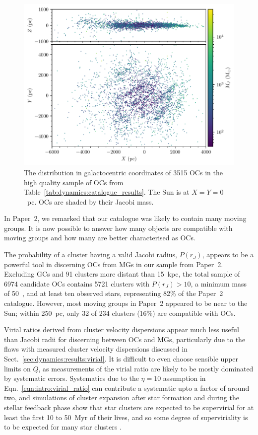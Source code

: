 \begin{figure}[t]
    \centering
    \includegraphics[width=\textwidth]{fig/c4/discussion_xyz_distribution.pdf}
    \caption[The distribution in galactocentric coordinates of 3515 OCs in the high quality sample of OCs]{The distribution in galactocentric coordinates of 3515 OCs in the high quality sample of OCs from Table~\ref{tab:dynamics:catalogue_results}. The Sun is at $X=Y=0$~pc. OCs are shaded by their Jacobi mass.}
    \label{fig:dynamics:discussion:xyz_distribution}
\end{figure}


In Paper~2, we remarked that our catalogue was likely to contain many moving groups. It is now possible to answer how many objects are compatible with moving groups and how many are better characterised as OCs.

The probability of a cluster having a valid Jacobi radius, $P(r_J)$, appears to be a powerful tool in discerning OCs from MGs in our sample from Paper~2. Excluding GCs and 91 clusters more distant than 15~kpc, the total sample of 6974 candidate OCs contains 5721 clusters with $P(r_J)>10$, a minimum mass of 50~\MSun, and at least ten observed stars, representing 82\% of the Paper~2 catalogue. However, most moving groups in Paper~2 appeared to be near to the Sun; within 250~pc, only 32 of 234 clusters (16\%) are compatible with OCs.

Virial ratios derived from cluster velocity dispersions appear much less useful than Jacobi radii for discerning between OCs and MGs, particularly due to the flaws with measured cluster velocity dispersions discussed in Sect.~\ref{sec:dynamics:results:virial}. It is difficult to even choose sensible upper limits on $Q$, as measurements of the virial ratio are likely to be mostly dominated by systematic errors. Systematics due to the $\eta=10$ assumption in Eqn.~\ref{eqn:intro:virial_ratio} can contribute a systematic upto a factor of around two, and simulations of cluster expansion after star formation and during the stellar feedback phase show that star clusters are expected to be supervirial for at least the first 10 to 50~Myr of their lives, and so some degree of superviriality is to be expected for many star clusters \citep{banerjee_how_2017}. 

